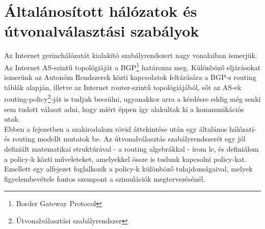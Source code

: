 



\newtheorem{definition}{Definíció}
\newtheorem{conjecture}{Sejtés}
\newtheorem{lemma}{Lemma}
\newtheorem{theorem}{Tétel}
\newtheorem{note}{Megjegyzés}




\chapter{Általánosított hálózatok és útvonalválasztási szabályok}\label{sect:chapter_modell}

Az Internet gerinchálózatát kialakító szabályrendszert nagy vonalaiban ismerjük. Az Internet AS-szintű topológiáját a BGP\footnote{Border Gateway Protocol} határozza meg. Különböző eljárásokat ismerünk az Autonóm Rendszerek közti kapcsolatok feltárására a BGP-s routing táblák alapján, illetve az Internet router-szintű topológiájából, sőt az AS-ek routing-policy\footnote{Útvonalválasztási szabályrendszer}-ját is tudjuk becsülni, ugyanakkor arra a kérdésre eddig még senki sem tudott választ adni, hogy miért éppen így alakultak ki a kommunikációs utak.\\

Ebben a fejezetben a szakirodalom rövid áttekintése után egy általános hálózati- és routing modellt mutatok be. Az útvonalválasztás szabályrendszerét egy jól definiált matematikai struktúrával - a routing algebrákkal - írom le, és definiálom a policy-k közti műveleteket, amelyekkel össze is tudunk kapcsolni policy-kat. Emellett egy alfejezet foglalkozik a policy-k különböző tulajdonságaival, melyek figyelembevétele fontos szempont a szimulációk megtervezésénél.

